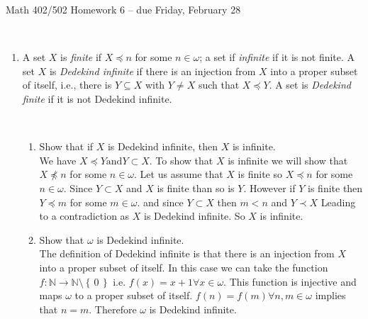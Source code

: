 \documentclass[11pt]{amsart}
\newcommand{\set}[1]{\left\{\,#1\,\right\}}
\begin{document}
\begin{center}
{\Large Math 402/502 Homework 6 -- due Friday, February 28}
\ \\
\end{center}

\ \\
 
 \begin{enumerate}

\item A set $X$ is  \emph{finite} if $X \preccurlyeq n$ for some $n \in \omega$; a set if \emph{infinite} if it is not finite. A set $X$ is \emph{Dedekind infinite} if there is an injection from $X$ into a proper subset of itself, i.e., there is $Y \subseteq X$ with $Y \neq X$ such that $X \preccurlyeq Y$. A set is {\it Dedekind finite} if it is not Dedekind infinite.

\ 
\begin{enumerate}
\item Show that if $X$ is Dedekind infinite, then $X$ is infinite.
\\
We have $X \preceq Y \text{and} Y \subset X$.
To show that $X$ is infinite we will show that $X \npreceq n$ for some $n \in \omega$.
Let us assume that $X$ is finite so $X \preceq n$ for some $n \in \omega$.
Since $Y \subset X$ and $X$ is finite than so is $Y$.
However if $Y$ is finite then $Y \preceq m$ for some $m \in \omega$.
and since $Y \subset X$ then $m < n$ and $Y \prec X$
Leading to a contradiction as $X$ is Dedekind infinite.
So $X$ is infinite.

\vfill
\item Show that $\omega$ is Dedekind infinite.
\\
The definition of Dedekind infinite is that there is an injection from $X$ into a proper subset of itself.
In this case we can take the function $f: \mathbb{N} \rightarrow \mathbb{N}\setminus \set{0}$ i.e. $f(x) = x+1 \forall x \in \omega$.
This function is injective and maps $\omega$ to a proper subset of itself.
$f(n) = f(m) \forall n,m \in \omega$ implies that $n = m$.
Therefore $\omega$ is Dedekind infinite.


\end{enumerate}
\end{enumerate}
\end{document}
